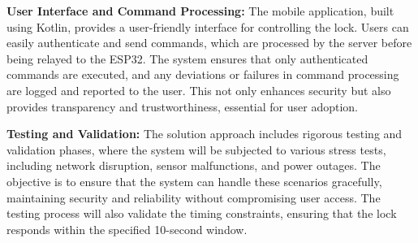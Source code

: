 \textbf{User Interface and Command Processing:}
The mobile application, built using Kotlin, provides a user-friendly interface for controlling the lock. Users can easily authenticate and send commands, which are processed by the server before being relayed to the ESP32. The system ensures that only authenticated commands are executed, and any deviations or failures in command processing are logged and reported to the user. This not only enhances security but also provides transparency and trustworthiness, essential for user adoption.

\textbf{Testing and Validation:}
The solution approach includes rigorous testing and validation phases, where the system will be subjected to various stress tests, including network disruption, sensor malfunctions, and power outages. The objective is to ensure that the system can handle these scenarios gracefully, maintaining security and reliability without compromising user access. The testing process will also validate the timing constraints, ensuring that the lock responds within the specified 10-second window.


